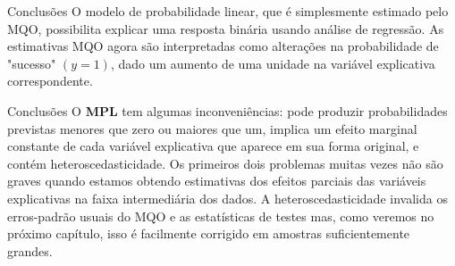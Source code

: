 \documentclass[t,14pt,mathserif]{beamer}
\begin{document}
{
\begin{frame}{Conclusões}
		\justifying 
		\vfill
        O modelo de probabilidade linear, que é simplesmente estimado pelo MQO, possibilita explicar uma resposta binária usando análise de regressão. 
       \vfill
      As estimativas MQO agora são interpretadas como alterações na probabilidade de "sucesso" $(y = 1)$, dado um aumento de uma unidade na variável explicativa correspondente.
        \vfill 
      
       

        \end{frame}
}  	

{
\begin{frame}{Conclusões}
		\justifying 
		\vfill
        O \textbf{MPL} tem algumas inconveniências: pode produzir probabilidades previstas menores que zero ou maiores que um, implica um efeito marginal constante de cada variável explicativa que aparece em sua forma original, e contém heteroscedasticidade.
       \vfill 
       Os primeiros dois problemas muitas vezes não são graves quando estamos obtendo estimativas dos efeitos parciais das variáveis explicativas na faixa intermediária dos dados.
        \vfill 
        A heteroscedasticidade invalida os erros-padrão usuais do MQO e as estatísticas de testes mas, como veremos no próximo capítulo, isso é facilmente corrigido em amostras suficientemente grandes.
       

        \end{frame}
}  	

	
\end{document}
